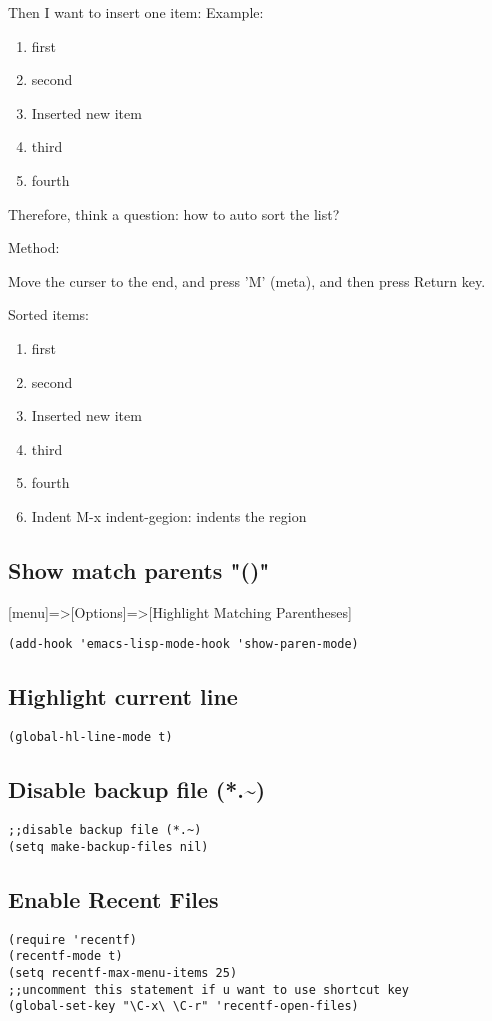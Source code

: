 \documentclass[11pt]{article}
\begin{document}
Then I want to insert one item:   
Example:
\begin{enumerate}
\item first
\item second
\item Inserted new item
\item third
\item fourth
\end{enumerate}

Therefore, think a question: how to auto sort the list?

Method:

Move the curser to the end, and press 'M' (meta), and then press Return key.

Sorted items:
\begin{enumerate}
\item first
\item second
\item Inserted new item
\item third
\item fourth

\item Indent
M-x indent-gegion: indents the region
\end{enumerate}
\subsection{Show match parents "()"}
\label{sec:org97017b6}
[menu]=>[Options]=>[Highlight Matching Parentheses]

\begin{verbatim}
(add-hook 'emacs-lisp-mode-hook 'show-paren-mode)
\end{verbatim}
\subsection{Highlight current line}
\label{sec:orgf946979}
\begin{verbatim}
(global-hl-line-mode t)
\end{verbatim}
\subsection{Disable backup file (*.\textasciitilde{})}
\label{sec:orgb8f56b7}
\begin{verbatim}
;;disable backup file (*.~)
(setq make-backup-files nil)
\end{verbatim}
\subsection{Enable Recent Files}
\label{sec:orgd6b896c}
\begin{verbatim}
(require 'recentf)
(recentf-mode t)
(setq recentf-max-menu-items 25)
;;uncomment this statement if u want to use shortcut key
(global-set-key "\C-x\ \C-r" 'recentf-open-files)
\end{verbatim}
\end{document}
